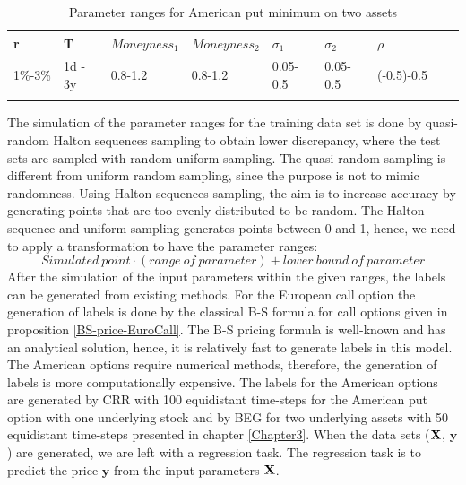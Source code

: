 \begin{table}[th]
\caption[Parameter Ranges In-sample for MLPs on Bivariate Contingent Claim]{Parameter ranges for American put minimum on two assets}
\label{tab:ExoticParRange}
\centering
\begin{tabular}{l l l l l l l l l}
\toprule
\textbf{r} & \textbf{T} & $Moneyness_1$ & $Moneyness_2$ & $\sigma_1$ & $\sigma_2$ & $\rho$ \\
\midrule
1\%-3\% & 1d - 3y & 0.8-1.2 & 0.8-1.2 & 0.05-0.5 & 0.05-0.5 & (-0.5)-0.5\\
\bottomrule\\
\end{tabular}
\end{table}

The simulation of the parameter ranges for the training data set is done by quasi-random Halton sequences sampling to obtain lower discrepancy, where the test sets are sampled with random uniform sampling. The quasi random sampling is different from uniform random sampling, since the purpose is not to mimic randomness. Using Halton sequences sampling, the aim is to increase accuracy by generating points that are too evenly distributed to be random. The Halton sequence and uniform sampling generates points between 0 and 1, hence, we need to apply a transformation to have the parameter ranges:
$$Simulated \ point \cdot (range \ of \ parameter) + lower \ bound \ of \ parameter$$
After the simulation of the input parameters within the given ranges, the labels can be generated from existing methods. For the European call option the generation of labels is done by the classical B-S formula for call options given in proposition \ref{BS-price-EuroCall}. The B-S pricing formula is well-known and has an analytical solution, hence, it is relatively fast to generate labels in this model. The American options require numerical methods, therefore, the generation of labels is more computationally expensive. The labels for the American options are generated by CRR with 100 equidistant time-steps for the American put option with one underlying stock and by BEG for two underlying assets with 50 equidistant time-steps presented in chapter \ref{Chapter3}. When the data sets ($\mathbf{X}$, $\bm{y}$) are generated, we are left with a regression task. The regression task is to predict the price $\bm{y}$ from the input parameters $\mathbf{X}$.\\ 

